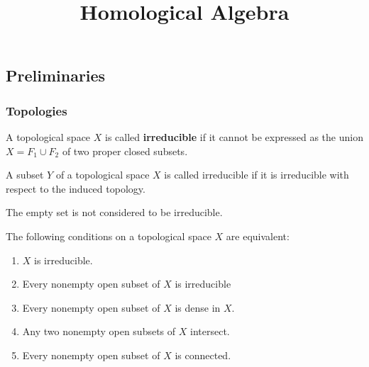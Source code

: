 \documentclass[12pt, oneside]{book}
\begin{document}
\frontmatter
\title{{\Huge{\textbf{Homological Algebra}}}}
\maketitle

\dominitoc %
\tableofcontents %


\mainmatter
{} %





\chapter{}

\section{Preliminaries} %
\subsection{Topologies}
\begin{definition}
    A topological space $X$ is called \textbf{irreducible} if it cannot be expressed as the union $X=F_1 \cup F_2$ of two proper closed subsets.

    A subset $Y$ of a topological space $X$ is called irreducible if it is irreducible with respect to the induced topology.

    The empty set is not considered to be irreducible.
\end{definition}

\begin{proposition}
    The following conditions on a topological space $X$ are equivalent:
    \begin{enumerate}
        \item
              $X$ is irreducible.
        \item
              Every nonempty open subset of $X$ is irreducible
        \item
              Every nonempty open subset of $X$ is dense in $X$.
        \item
              Any two nonempty open subsets of $X$ intersect.
        \item
              Every nonempty open subset of $X$ is connected.
    \end{enumerate}
\end{proposition}
\end{document}
